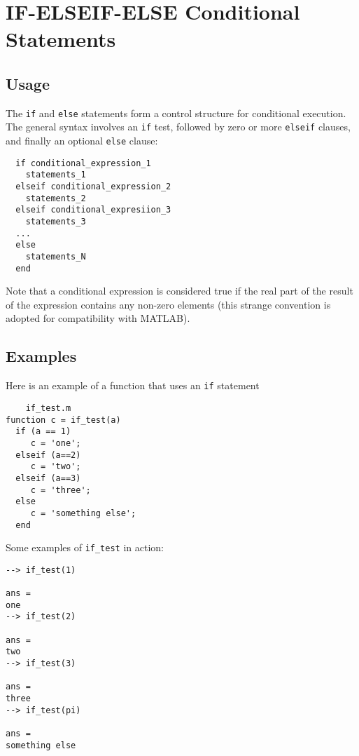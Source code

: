 \section{IF-ELSEIF-ELSE Conditional Statements}

\subsection{Usage}

The \verb|if| and \verb|else| statements form a control structure for
conditional execution.  The general syntax involves an \verb|if|
test, followed by zero or more \verb|elseif| clauses, and finally
an optional \verb|else| clause:
\begin{verbatim}
  if conditional_expression_1
    statements_1
  elseif conditional_expression_2
    statements_2
  elseif conditional_expresiion_3
    statements_3
  ...
  else
    statements_N
  end
\end{verbatim}
Note that a conditional expression is considered true if 
the real part of the result of the expression contains
any non-zero elements (this strange convention is adopted
for compatibility with MATLAB).
\subsection{Examples}

Here is an example of a function that uses an \verb|if| statement
\begin{verbatim}
    if_test.m
function c = if_test(a)
  if (a == 1)
     c = 'one';
  elseif (a==2)
     c = 'two';
  elseif (a==3)
     c = 'three';
  else
     c = 'something else';
  end
\end{verbatim}
Some examples of \verb|if_test| in action:
\begin{verbatim}
--> if_test(1)

ans = 
one
--> if_test(2)

ans = 
two
--> if_test(3)

ans = 
three
--> if_test(pi)

ans = 
something else
\end{verbatim}
